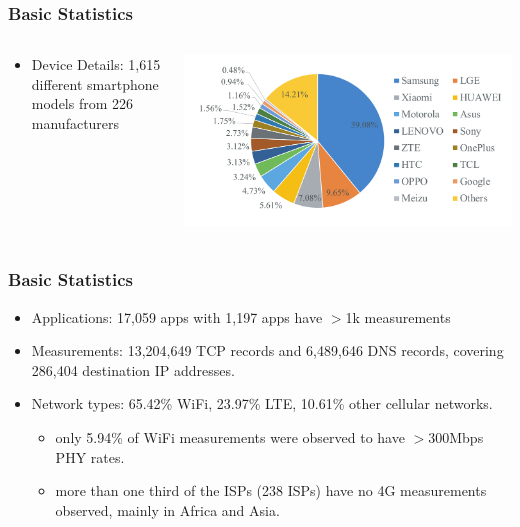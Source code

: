 \begin{frame}
    \frametitle{Basic Statistics}

    \begin{columns}
        \begin{column}{.35\textwidth}
            \begin{itemize}
                \item Device Details: 1,615 different smartphone models from 226 manufacturers
            \end{itemize}
        \end{column}

        \begin{column}{.65\textwidth}
            \includegraphics[width=\textwidth]{fig/phone_manufactory.pdf}
        \end{column}
    \end{columns}
\end{frame}

\begin{frame}
    \frametitle{Basic Statistics}

    \begin{itemize}
        \item Applications: 17,059 apps with 1,197 apps have $>$1k measurements
        \item Measurements: 13,204,649 TCP records and 6,489,646 DNS records, covering 286,404 destination IP addresses.
        \item Network types: 65.42\% WiFi, 23.97\% LTE, 10.61\% other cellular networks.
        \begin{itemize}
            \item only 5.94\% of WiFi measurements were observed to have $>$300Mbps PHY rates.
            \item more than one third of the ISPs (238 ISPs) have no 4G measurements observed, mainly in Africa and Asia.
        \end{itemize}
    \end{itemize}
\end{frame}
